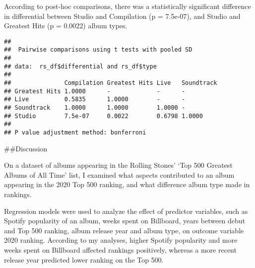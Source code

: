 \documentclass[
]{article}
\newenvironment{Shaded}{\begin{snugshade}}{\end{snugshade}}
\newcommand{\AttributeTok}[1]{\textcolor[rgb]{0.13,0.29,0.53}{#1}}
\newcommand{\FunctionTok}[1]{\textcolor[rgb]{0.13,0.29,0.53}{\textbf{#1}}}
\newcommand{\NormalTok}[1]{#1}
\newcommand{\SpecialCharTok}[1]{\textcolor[rgb]{0.81,0.36,0.00}{\textbf{#1}}}
\newcommand{\StringTok}[1]{\textcolor[rgb]{0.31,0.60,0.02}{#1}}
\begin{document}
According to post-hoc comparisons, there was a statistically significant
difference in differential between Studio and Compilation (p = 7.5e-07),
and Studio and Greatest Hits (p = 0.0022) album types.

\begin{Shaded}
\end{Shaded}

\begin{verbatim}
## 
##  Pairwise comparisons using t tests with pooled SD 
## 
## data:  rs_df$differential and rs_df$type 
## 
##               Compilation Greatest Hits Live   Soundtrack
## Greatest Hits 1.0000      -             -      -         
## Live          0.5835      1.0000        -      -         
## Soundtrack    1.0000      1.0000        1.0000 -         
## Studio        7.5e-07     0.0022        0.6798 1.0000    
## 
## P value adjustment method: bonferroni
\end{verbatim}

\#\#Discussion

On a dataset of albums appearing in the Rolling Stones' `Top 500
Greatest Albums of All Time' list, I examined what aspects contributed
to an album appearing in the 2020 Top 500 ranking, and what difference
album type made in rankings.

Regression models were used to analyze the effect of predictor
variables, such as Spotify popularity of an album, weeks spent on
Billboard, years between debut and Top 500 ranking, album release year
and album type, on outcome variable 2020 ranking. According to my
analyses, higher Spotify popularity and more weeks spent on Billboard
affected rankings positively, whereas a more recent release year
predicted lower ranking on the Top 500.
\end{document}
